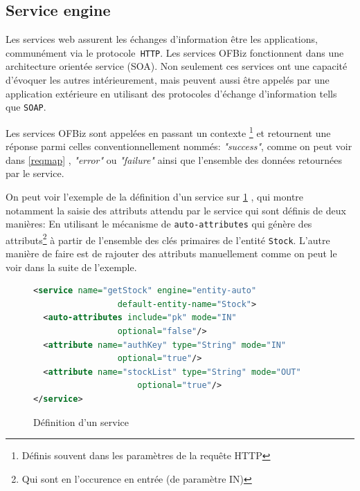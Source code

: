 \subsection{Service engine}
Les services web assurent les échanges d'information être les applications, communément via le protocole\verb| HTTP|.   
Les services OFBiz fonctionnent dans une architecture orientée service (SOA). Non seulement ces services ont une capacité d'évoquer les autres intérieurement, mais peuvent aussi être appelés par une application extérieure en utilisant des protocoles d'échange d'information tells que \verb|SOAP|. 

Les services OFBiz sont appelées en passant un contexte \footnote{Définis souvent dans les paramètres de la requête HTTP } et retournent une réponse parmi celles conventionnellement nommés: \emph{"success"}, comme on peut voir dans  \ref{reqmap} , \emph{"error"} ou \emph{"failure"} ainsi que l'ensemble des données retournées par le service. 

On peut voir l'exemple de la définition d'un service sur \ref{servicedef} , qui montre notamment la saisie des attributs attendu par le service qui sont définis de deux manières: En utilisant le mécanisme de \verb|auto-attributes| qui génère des attributs\footnote{Qui sont en l'occurence en entrée (de paramètre IN)} à partir de l'ensemble des clés primaires de l'entité \verb|Stock|. L'autre manière de faire est de rajouter des attributs manuellement comme on peut le voir dans la suite de l'exemple. 


\begin{figure}
\begin{lstlisting}[frame=leftline,language=XML]
<service name="getStock" engine="entity-auto"
				 default-entity-name="Stock">
  <auto-attributes include="pk" mode="IN"
  				 optional="false"/>
  <attribute name="authKey" type="String" mode="IN" 
  				 optional="true"/>
  <attribute name="stockList" type="String" mode="OUT"
  			         optional="true"/>
</service>
\end{lstlisting}
\caption{Définition d'un service}
\label{servicedef}
\end{figure}


